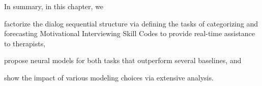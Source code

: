 In summary, in this chapter, we
\begin{inparaenum}[(1)]
\item factorize the dialog sequential structure via defining the tasks
  of categorizing and forecasting Motivational Interviewing Skill
  Codes to provide real-time assistance to therapists,
\item propose neural models for both tasks that outperform several
  baselines, and
\item show the impact of various modeling choices via extensive
  analysis.
\end{inparaenum}













